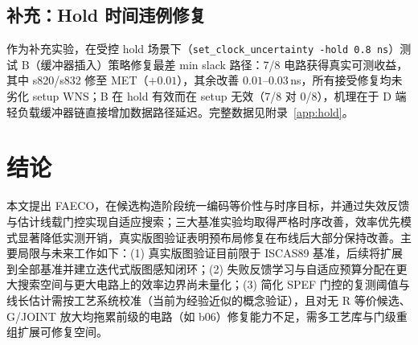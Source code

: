 \documentclass[journal]{IEEEtran}
\begin{document}
\subsection{补充：Hold 时间违例修复}\label{sec:hold}

作为补充实验，在受控 hold 场景下（\texttt{set\_clock\_uncertainty -hold 0.8\,ns}）测试 B（缓冲器插入）策略修复最差 min slack 路径：7/8 电路获得真实可测收益，其中 s820/s832 修至 MET（$+0.01$），其余改善 $0.01$--$0.03$\,ns，所有接受修复均未劣化 setup WNS；B 在 hold 有效而在 setup 无效（7/8 对 0/8），机理在于 D 端轻负载缓冲器链直接增加数据路径延迟。完整数据见附录~\ref{app:hold}。

\section{结论}\label{sec:conclusion}

本文提出 FAECO，在候选构造阶段统一编码等价性与时序目标，并通过失效反馈与估计线载门控实现自适应搜索；三大基准实验均取得严格时序改善，效率优先模式显著降低实测开销，真实版图验证表明预布局修复在布线后大部分保持改善。主要局限与未来工作如下：(1) 真实版图验证目前限于 ISCAS89 基准，后续将扩展到全部基准并建立迭代式版图感知闭环；(2) 失败反馈学习与自适应预算分配在更大搜索空间与更大电路上的效率边界尚未量化；(3) 简化 SPEF 门控的复测阈值与线长估计需按工艺系统校准（当前为经验近似的概念验证），且对无 R 等价候选、G/JOINT 放大均拖累前级的电路（如 b06）修复能力不足，需多工艺库与门级重组扩展可修复空间。
\end{document}
